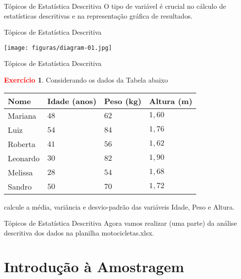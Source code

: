 \documentclass[10pt]{beamer}
\renewcommand{\indent}{\hspace*{2em}}
\theoremstyle{definition}
\newtheorem{exerc}{\textcolor{red}{Exercício}}[section]
\begin{document}
\begin{frame}{Tópicos de Estatística Descritiva}
\indent O tipo de variável é crucial no cálculo de estatísticas descritivas e na representação gráfica de resultados.
\end{frame}

\begin{frame}{Tópicos de Estatística Descritiva}
 \begin{center}
  \texttt{[image: figuras/diagram-01.jpg]}
 \end{center}
\end{frame}

\begin{frame}{Tópicos de Estatística Descritiva}
\begin{exerc}
\vfill\indent Considerando os dados da Tabela abaixo
\begin{table}[]
\begin{tabular}{|l|l|l|l|}
\hline
 Nome & Idade (anos) & Peso (kg) & Altura (m) \\ \hline
 Mariana & $48$ & $62$ & $1,60$ \\ \hline
 Luiz & $54$ & $84$ & $1,76$ \\ \hline
 Roberta & $41$ & $56$ & $1,62$ \\ \hline
 Leonardo & $30$ & $82$ & $1,90$ \\ \hline
 Melissa & $28$ & $54$ & $1,68$ \\ \hline
 Sandro & $50$ & $70$ & $1,72$ \\ \hline
\end{tabular}
\end{table}
calcule a média, variância e desvio-padrão das variáveis Idade, Peso e Altura.
\end{exerc}
\end{frame}

\begin{frame}{Tópicos de Estatística Descritiva}
\indent Agora vamos realizar (uma parte) da análise descritiva dos dados na planilha motocicletas.xlsx.
\end{frame}

\section{Introdução à Amostragem}
\end{document}

